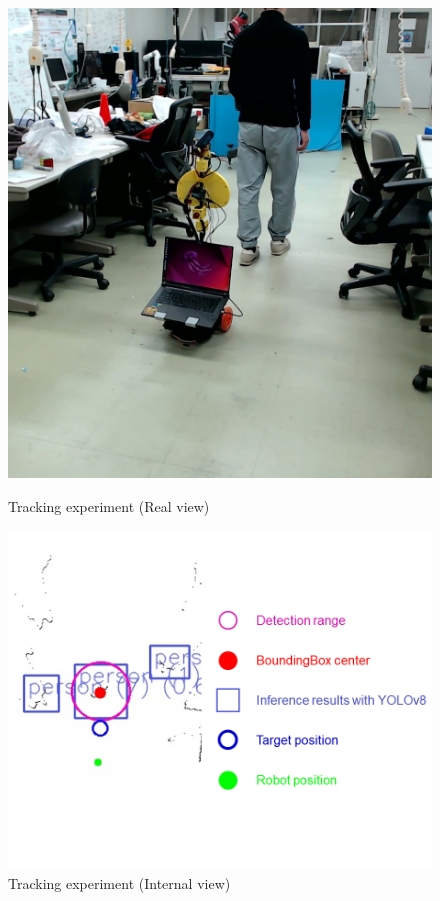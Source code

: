 \begin{figure}[h]
  \begin{minipage}[b]{0.45\linewidth}
    \centering
    \includegraphics[keepaspectratio, scale=0.2]{figure/Tracking-experiment-Real-view.jpg}
    \caption{Tracking experiment (Real view)}
    \label{Tracking experiment (Real view)}
  \end{minipage}
  \begin{minipage}[b]{0.45\linewidth}
    \centering
    \includegraphics[keepaspectratio, scale=0.4]{figure/Tracking-experiment-Internal-view.png}
    \caption{Tracking experiment (Internal view)}
    \label{Tracking experiment (Internal view)}
  \end{minipage}
\end{figure}

